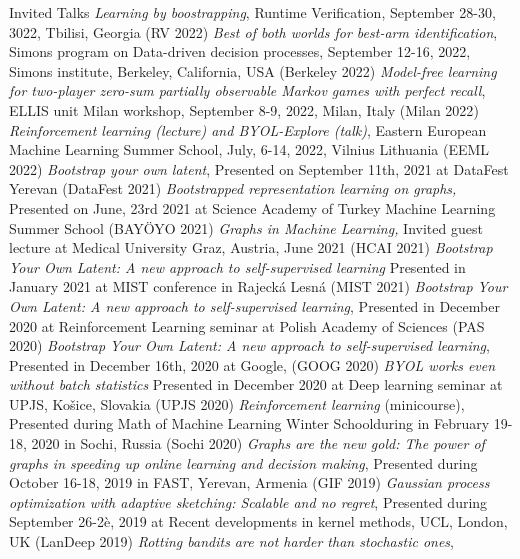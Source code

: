 \documentclass{resume}
\begin{document}
\begin{category}{Invited Talks}
	\citembullet
	\emph{Learning by boostrapping}, 
	 Runtime Verification, September 28-30, 3022, Tbilisi, Georgia
	 ({\sf RV 2022})
\citembullet
\emph{Best of both worlds for best-arm identification}, 
 Simons program on Data-driven decision processes, September 12-16, 2022, Simons institute, Berkeley, California, USA
 ({\sf Berkeley 2022})
\citembullet
\emph{Model-free learning for two-player zero-sum partially observable Markov games with perfect recall}, 
 ELLIS unit Milan workshop, September 8-9, 2022,  Milan, Italy  
 ({\sf Milan 2022})
\citembullet
\emph{Reinforcement learning (lecture) and BYOL-Explore (talk)}, 
 Eastern European Machine Learning Summer School, July, 6-14, 2022, Vilnius Lithuania
 ({\sf EEML 2022})
\citembullet
\emph{Bootstrap your own latent}, 
Presented on September 11th, 2021 at  DataFest Yerevan
({\sf DataFest 2021})
\citembullet
\emph{Bootstrapped representation learning on graphs,} 
Presented on June, 23rd 2021 at  Science Academy of Turkey Machine Learning Summer School
({\sf BAY\"OYO  2021})
\citembullet
\emph{Graphs in Machine Learning,} 
Invited guest lecture at Medical University Graz, Austria, June 2021
({\sf HCAI  2021})
\citembullet
\emph{Bootstrap Your Own Latent: A new approach to self-supervised learning} 
Presented in January  2021 at MIST conference in Rajeck\' a Lesn\' a 
({\sf MIST  2021})
\citembullet
\emph{Bootstrap Your Own Latent: A new approach to self-supervised learning}, 
 Presented in December  2020 at Reinforcement Learning seminar at Polish Academy of Sciences
({\sf PAS  2020})
\citembullet
\emph{Bootstrap Your Own Latent: A new approach to self-supervised learning}, 
Presented in December 16th, 2020 at Google,
({\sf GOOG  2020})
\citembullet
\emph{BYOL works even without batch statistics} 
Presented in December  2020 at Deep learning seminar at UPJS, Ko\v{s}ice, Slovakia
({\sf UPJS  2020})
\citembullet
\emph{Reinforcement learning} (minicourse),
Presented during Math of Machine Learning Winter Schoolduring in February 19-18, 2020 in Sochi, Russia 
({\sf Sochi  2020})
\citembullet
\emph{Graphs are the new gold: The power of graphs in speeding up online learning and decision making},
Presented during October 16-18, 2019 in FAST, Yerevan, Armenia 
({\sf GIF  2019})
\citembullet
\emph{Gaussian process optimization with adaptive sketching: Scalable and no regret},
Presented during September 26-2è, 2019 at Recent developments in kernel methods, UCL, London, UK
({\sf LanDeep 2019})
\citembullet
\emph{Rotting bandits are not harder than stochastic ones},

\end{category}
\end{document}
